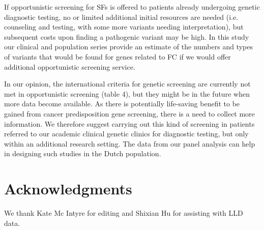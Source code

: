 If opportunistic screening for SFs is offered to patients already undergoing genetic diagnostic testing, no or limited additional initial resources are needed (i.e. counseling and testing, with  some more variants needing interpretation), but subsequent costs upon finding a pathogenic variant may be high. 
In this study our clinical and population series provide an estimate of the numbers and types of variants that would be found for genes related to FC if we would offer additional opportunistic screening service. 

In our opinion, the international criteria for genetic screening are currently not met in opportunistic screening (table 4), but they might be in the future when more data become available.  %
As there is potentially life-saving benefit to be gained from cancer predisposition gene screening, there is a need to collect more information. 
We therefore suggest carrying out this kind of screening in patients referred to our academic clinical genetic clinics for diagnostic testing, but only within an additional research setting. 
The data from our panel analysis can help in designing such studies in the Dutch population.




\section{Acknowledgments}\label{Acknowledgments} 
We thank Kate Mc Intyre for editing and Shixian Hu for assisting with LLD data.

